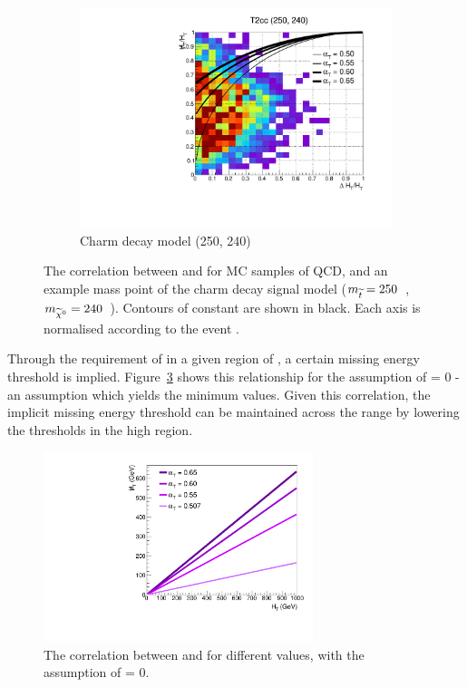 \begin{figure}[t!]
\begin{subfigure}[t]{.46\textwidth}
    \includegraphics[width=\textwidth]
    {Figs/alphat/alphat_correlation_T2cc_250_240_ge4j_done3.pdf}
    \caption{Charm decay model (250, 240)}
    \label{fig:alphat_corr_t2cc}
  \end{subfigure}
  \caption{The correlation between \mht and \deltaHT for MC samples of QCD,
  \zinv and an example mass point of the charm decay signal model ($m_{\widetilde{t}} =
  250$~\gev, $m_{\widetilde{\chi}^{0}} = 240$~\gev). Contours of constant \alphat are shown in
  black. Each axis is normalised according to the event \HT.}
  \label{fig:alphat_corr}
\end{figure}

Through the requirement of \alphat in a given region of \HT, a certain missing
energy threshold is implied. Figure~\ref{fig:alphat_mht_corr} shows this
relationship for
the assumption of \deltaHT = 0 - an assumption which yields the minimum \mht
values. Given this correlation, the implicit missing energy threshold can be
maintained across the \HT range by lowering the \alphat thresholds in the high
\HT
region.

\begin{figure}
  \centering
  \includegraphics[width=0.7\textwidth]{Figs/alphat/mht_correlation.pdf}
  \caption{The correlation between \HT and \mht for different \alphat values,
  with the assumption of \deltaHT = 0.}
  \label{fig:alphat_mht_corr}
\end{figure}

